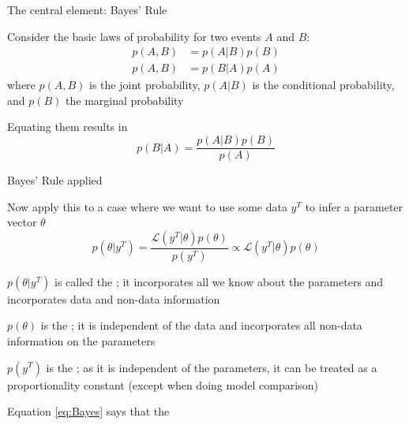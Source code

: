 \begin{frame}{The central element: Bayes' Rule}
\begin{witemize}
    \item Consider the basic laws of probability for two events $A$ and $B$:
    \begin{align}
        p\left( {A,B} \right) &= p\left( {A|B} \right)p\left( B \right) \\
        p\left( {A,B} \right) &= p\left( {B|A} \right)p\left( A \right)
    \end{align}
    where $p\left( {A,B} \right)$ is the joint probability, $p\left( {A|B} \right)$ is the conditional probability, and $p\left( B \right)$ the marginal probability
    \item Equating them results in 
    \begin{equation}
    p\left( {B|A} \right) = \frac{{p\left( {A|B} \right)p\left( B \right)}}{{p\left( A \right)}}
    \end{equation}
\end{witemize}
\end{frame}


\begin{frame}{Bayes' Rule applied}
\begin{witemize}
    \item Now apply this to a case where we want to use some data $y^T$ to infer a parameter vector $\theta$
        \begin{equation}
            p\left( {\theta |{y^T}} \right) = \frac{\mathcal{L}\left( {{y^T}|\theta } \right)p\left( \theta  \right)}{p\left( y^T \right)} \propto \mathcal{L}\left( {{y^T}|\theta } \right)p\left( \theta  \right) \label{eq:Bayes}
        \end{equation}
    \item $p\left( {\theta |{y^T}} \right)$ is called the ; it incorporates all we know about the parameters and incorporates data and non-data information
    \item $p\left( \theta \right)$ is the ; it is independent of the data and incorporates all non-data information on the parameters
    \item $p\left( y^T \right)$ is the ; as it is independent of the parameters, it can be treated as a proportionality constant (except when doing model comparison)
    \item Equation \eqref{eq:Bayes} says that the 
\end{witemize}
\end{frame}


